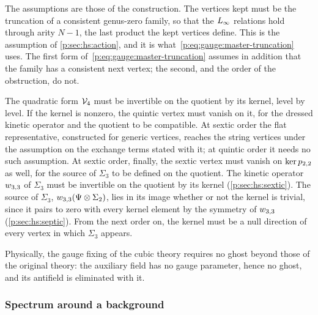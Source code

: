 The assumptions are those of the construction.
The vertices kept must be the truncation of a consistent genus-zero family, so that the $L_\infty$ relations hold through arity $N - 1$, the last product the kept vertices define.
This is the assumption of \cref{p:sec:hs:action}, and it is what~\eqref{p:eq:gauge:master-truncation} uses.
The first form of~\eqref{p:eq:gauge:master-truncation} assumes in addition that the family has a consistent next vertex; the second, and the order of the obstruction, do not.

The quadratic form $\mathcal{V}_{4}$ must be invertible on the quotient by its kernel, level by level.
If the kernel is nonzero, the quintic vertex must vanish on it, for the dressed kinetic operator and the quotient to be compatible.
At sextic order the flat representative, constructed for generic vertices, reaches the string vertices under the assumption on the exchange terms stated with it; at quintic order it needs no such assumption.
At sextic order, finally, the sextic vertex must vanish on $\ker p_{2,2}$ as well, for the source of $\Sigma_3$ to be defined on the quotient.
The kinetic operator $w_{3,3}$ of $\Sigma_3$ must be invertible on the quotient by its kernel (\cref{p:sec:hs:sextic}).
The source of $\Sigma_3$, $w_{3,3}(\Psi \otimes \Sigma_2)$, lies in its image whether or not the kernel is trivial, since it pairs to zero with every kernel element by the symmetry of $w_{3,3}$ (\cref{p:sec:hs:septic}).
  From the next order on, the kernel must be a null direction of every vertex in which $\Sigma_3$ appears.

Physically, the gauge fixing of the cubic theory requires no ghost beyond those of the original theory: the auxiliary field has no gauge parameter, hence no ghost, and its antifield is eliminated with it.

\subsubsection{Spectrum around a background}
\label{p:sec:gauge:spectrum}

